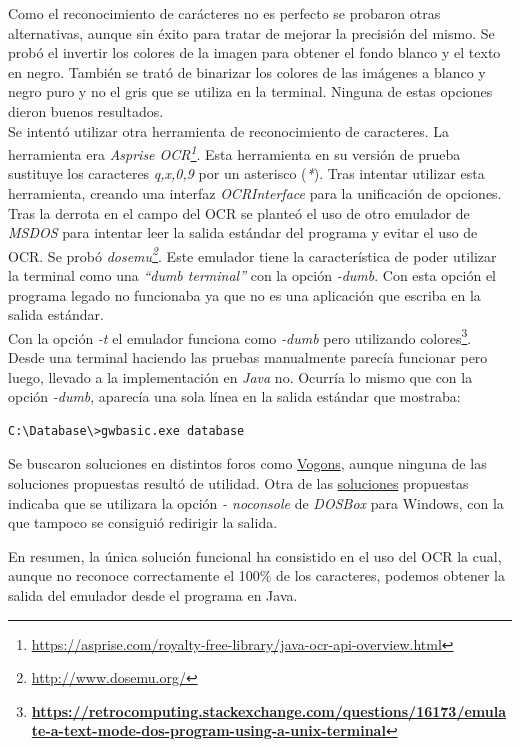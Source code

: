 \documentclass[10pt,a4paper]{article}
\begin{document}
Como el reconocimiento de carácteres no es perfecto se probaron otras alternativas, aunque sin éxito para tratar de mejorar la precisión del mismo. Se probó el invertir los colores de la imagen para obtener el fondo blanco y el texto en negro. También se trató de binarizar los colores de las imágenes a blanco y negro puro y no el gris que se utiliza en la terminal. Ninguna de estas opciones dieron buenos resultados.\\
Se intentó utilizar otra herramienta de reconocimiento de caracteres. La herramienta era \emph{Asprise OCR\footnote{\url{https://asprise.com/royalty-free-library/java-ocr-api-overview.html}}}. Esta herramienta en su versión de prueba sustituye los caracteres \emph{q,x,0,9} por un asterisco (\emph{*}). Tras intentar utilizar esta herramienta, creando una interfaz \emph{OCRInterface} para la unificación de opciones.\\

Tras la derrota en el campo del OCR se planteó el uso de otro emulador de \emph{MSDOS} para intentar leer la salida estándar del programa y evitar el uso de OCR. Se probó \emph{dosemu\footnote{\url{http://www.dosemu.org/}}}. Este emulador tiene la característica de poder utilizar la terminal como una \emph{``dumb terminal''} con la opción \emph{-dumb}. Con esta opción el programa legado no funcionaba ya que no es una aplicación que escriba en la salida estándar.\\
Con la opción \emph{-t} el emulador funciona como \emph{-dumb} pero utilizando colores\footnote{\textbf{\url{https://retrocomputing.stackexchange.com/questions/16173/emulate-a-text-mode-dos-program-using-a-unix-terminal}}}. Desde una terminal haciendo las pruebas manualmente parecía funcionar pero luego, llevado a la implementación en \emph{Java} no. Ocurría lo mismo que con la opción \emph{-dumb}, aparecía una sola línea en la salida estándar que mostraba:

\begin{lstlisting}
C:\Database\>gwbasic.exe database
\end{lstlisting}

Se buscaron soluciones en distintos foros como \href{https://www.vogons.org/viewtopic.php?t=36268}{Vogons}, aunque ninguna de las soluciones propuestas resultó de utilidad. Otra de las \href{https://www.reddit.com/r/dosbox/comments/bvoij9/piping_dosboxs_output_to_stdout_and_stderr/}{soluciones} propuestas indicaba que se utilizara la opción \textit{- noconsole} de \textit{DOSBox} para Windows, con la que tampoco se consiguió redirigir la salida.

En resumen, la única solución funcional ha consistido en el uso del OCR la cual, aunque no reconoce correctamente el 100\% de los caracteres, podemos obtener la salida del emulador desde el programa en Java.
\end{document}

